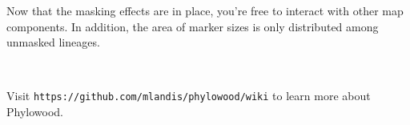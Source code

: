 \documentclass[11pt]{article}
\newcommand{\impmark}{\strut\vadjust{\domark}}
\newcommand{\domark}{%
  \vbox to 0pt{
    \kern-\dp\strutbox
    \smash{\llap{$\rightarrow$\kern1em}}
    \vss
  }%
}
\begin{document}
Now that the masking effects are in place, you're free to interact with other map components.
In addition, the area of marker sizes is only distributed among unmasked lineages.

\noindent \\ \impmark Visit \texttt{https://github.com/mlandis/phylowood/wiki} to learn more about Phylowood.

%
%
%
%
%
%
%
%
%
%
\end{document}
